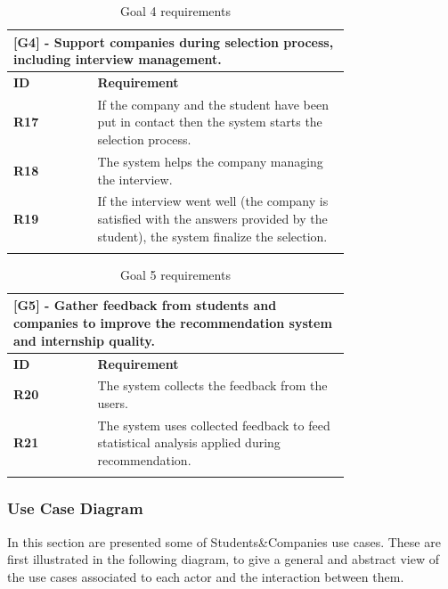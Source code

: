 \documentclass[12pt]{article}
\numberwithin{figure}{section}
\numberwithin{table}{section}
\begin{document}
    \begin{center}
        \begin{longtable}{|l|p{0.75\linewidth}|}
            \hline
            \multicolumn{2}{|p{0.75\linewidth}|}{\textbf{[G4] - Support companies during selection process, including interview management.}} \\
            \hline
            \textbf{ID} & \textbf{Requirement}  \\
            \hline
            \textbf{R17} & If the company and the student have been put in contact then the system starts the selection process. \\
            \hline
            \textbf{R18} & The system helps the company managing the interview. \\
            \hline
            \textbf{R19} & If the interview went well (the company is satisfied with the answers provided by the student), the system finalize the selection. \\
            \hline
            \caption{Goal 4 requirements}
        \end{longtable}
    \end{center}

    \begin{center}
        \begin{longtable}{|l|p{0.75\linewidth}|}
            \hline
            \multicolumn{2}{|p{0.75\linewidth}|}{\textbf{[G5] - Gather feedback from students and companies to improve the recommendation system and internship quality.}} \\
            \hline
            \textbf{ID} & \textbf{Requirement}  \\
            \hline
            \textbf{R20} & The system collects the feedback from the users. \\
            \hline
            \textbf{R21} & The system uses collected feedback to feed statistical analysis applied during recommendation. \\
            \hline
            \caption{Goal 5 requirements}
        \end{longtable}
    \end{center}
\newpage
\subsubsection{Use Case Diagram}
    
    In this section are presented some of Students\&Companies use cases. These are first illustrated in the following diagram, to give a general and abstract view of the use cases associated to each actor and the interaction between them. 
    
\end{document}
